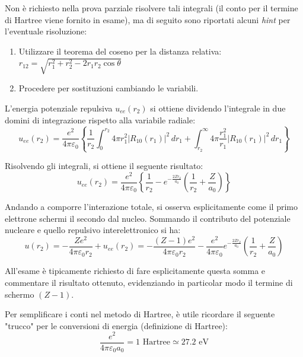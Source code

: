 \begin{exercise}
\begin{remark}
    Non è richiesto nella prova parziale risolvere tali integrali (il conto per il termine di Hartree viene fornito in esame), ma di seguito sono riportati alcuni \textit{hint} per l'eventuale risoluzione:
    \begin{enumerate}
        \item Utilizzare il teorema del coseno per la distanza relativa: \( r_{12} = \sqrt{r_1^2 + r_2^2 - 2r_1 r_2 \cos\theta} \)
        \item Procedere per sostituzioni cambiando le variabili.
    \end{enumerate}
\end{remark}

L'energia potenziale repulsiva \( u_{ee}(r_2) \) si ottiene dividendo l'integrale in due domini di integrazione rispetto alla variabile radiale:
\begin{equation}
    u_{ee}(r_2) = \frac{e^2}{4\pi\varepsilon_0} \left\{ \frac{1}{r_2} \int_0^{r_2} 4\pi r_1^2 |R_{10}(r_1)|^2 \, dr_1 + \int_{r_2}^\infty 4\pi \frac{r_1^2}{r_1} |R_{10}(r_1)|^2 \, dr_1 \right\}
\end{equation}

Risolvendo gli integrali, si ottiene il seguente risultato:
\begin{equation}
    u_{ee}(r_2) = \frac{e^2}{4\pi\varepsilon_0} \left\{ \frac{1}{r_2} - e^{-\frac{2Z r_2}{a_0}} \left( \frac{1}{r_2} + \frac{Z}{a_0} \right) \right\}
\end{equation}

Andando a comporre l'interazione totale, si osserva esplicitamente come il primo elettrone schermi il secondo dal nucleo. Sommando il contributo del potenziale nucleare e quello repulsivo interelettronico si ha:
\begin{equation}
    u(r_2) = -\frac{Ze^2}{4\pi\varepsilon_0 r_2} + u_{ee}(r_2) = -\frac{(Z-1)e^2}{4\pi\varepsilon_0 r_2} - \frac{e^2}{4\pi\varepsilon_0} e^{-\frac{2Z r_2}{a_0}} \left( \frac{1}{r_2} + \frac{Z}{a_0} \right)
\end{equation}

\begin{attention}
    All'esame è tipicamente richiesto di fare esplicitamente questa somma e commentare il risultato ottenuto, evidenziando in particolar modo il termine di schermo \( (Z-1) \).
\end{attention}

Per semplificare i conti nel metodo di Hartree, è utile ricordare il seguente "trucco" per le conversioni di energia (definizione di Hartree):
\begin{equation}
    \frac{e^2}{4\pi\varepsilon_0 a_0} = 1 \text{ Hartree} \simeq 27.2 \text{ eV}
\end{equation}


\end{exercise}
